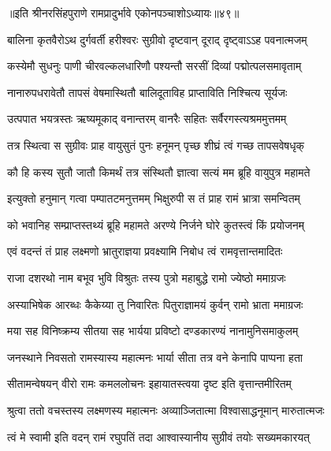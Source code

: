 ॥इति श्रीनरसिंहपुराणे रामप्रादुर्भावे एकोनपञ्चाशोऽध्यायः॥४९॥



\twolineshloka
{बालिना कृतवैरोऽथ दुर्गवर्ती हरीश्वरः}
{सुग्रीवो दृष्टवान् दूराद् दृष्ट्वाऽऽह पवनात्मजम्} %

\twolineshloka
{कस्येमौ सुधनुः पाणी चीरवल्कलधारिणौ}
{पश्यन्तौ सरसीं दिव्यां पद्मोत्पलसमावृताम्} %

\twolineshloka
{नानारुपधरावेतौ तापसं वेषमास्थितौ}
{बालिदूताविह प्राप्ताविति निश्चित्य सूर्यजः} %

\twolineshloka
{उत्पपात भयत्रस्तः ऋष्यमूकाद् वनान्तरम्}
{वानरैः सहितः सर्वैरगस्त्यश्रममुत्तमम्} %

\twolineshloka
{तत्र स्थित्वा स सुग्रीवः प्राह वायुसुतं पुनः}
{हनूमन् पृच्छ शीघ्रं त्वं गच्छ तापसवेषधृक्} %

\twolineshloka
{कौ हि कस्य सुतौ जातौ किमर्थं तत्र संस्थितौ}
{ज्ञात्वा सत्यं मम ब्रूहि वायुपुत्र महामते} %

\twolineshloka
{इत्युक्तो हनुमान् गत्वा पम्पातटमनुत्तमम्}
{भिक्षुरुपी स तं प्राह रामं भ्रात्रा समन्वितम्} %

\twolineshloka
{को भवानिह सम्प्राप्तस्तथ्यं ब्रूहि महामते}
{अरण्ये निर्जने घोरे कुतस्त्वं किं प्रयोजनम्} %

\twolineshloka
{एवं वदन्तं तं प्राह लक्ष्मणो भ्रातुराज्ञया}
{प्रवक्ष्यामि निबोध त्वं रामवृत्तान्तमादितः} %

\twolineshloka
{राजा दशरथो नाम बभूव भुवि विश्रुतः}
{तस्य पुत्रो महाबुद्धे रामो ज्येष्ठो ममाग्रजः} %

\twolineshloka
{अस्याभिषेक आरब्धः कैकेय्या तु निवारितः}
{पितुराज्ञामयं कुर्वन् रामो भ्राता ममाग्रजः} %

\twolineshloka
{मया सह विनिष्क्रम्य सीतया सह भार्यया}
{प्रविष्टो दण्डकारण्यं नानामुनिसमाकुलम्} %

\twolineshloka
{जनस्थाने निवसतो रामस्यास्य महात्मनः}
{भार्या सीता तत्र वने केनापि पाप्पना हता} %

\twolineshloka
{सीतामन्वेषयन् वीरो रामः कमललोचनः}
{इहायातस्त्वया दृष्ट इति वृत्तान्तमीरितम्} %

\twolineshloka
{श्रुत्वा ततो वचस्तस्य लक्ष्मणस्य महात्मनः}
{अव्याञ्जितात्मा विश्वासाद्धनूमान् मारुतात्मजः} %

\twolineshloka
{त्वं मे स्वामी इति वदन् रामं रघुपतिं तदा}
{आश्वास्यानीय सुग्रीवं तयोः सख्यमकारयत्} %

